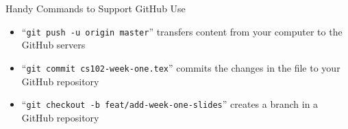 \documentclass[14pt,aspectratio=169]{beamer}
\begin{document}
%
\begin{frame}{Handy Commands to Support GitHub Use}
  \begin{itemize}
    \item ``{\tt git push -u origin master}'' transfers content from your computer
      to the GitHub servers
    \item ``{\tt git commit cs102-week-one.tex}'' commits the changes in the
      file to your GitHub repository
    \item ``{\tt git checkout -b feat/add-week-one-slides}'' creates a branch in
      a GitHub repository
  \end{itemize}
\end{frame}
\end{document}
